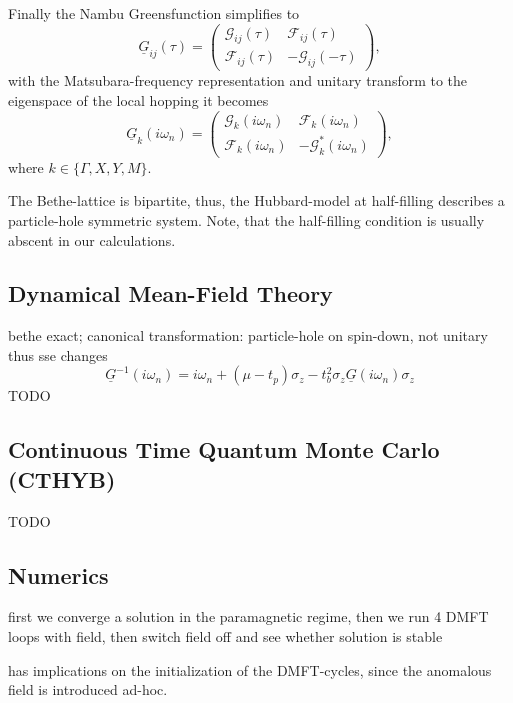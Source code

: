 \documentclass[aps,prb,twocolumn,groupedaddress,amsmath,amssymb]{revtex4-1}
\newcommand{\nambu}[1]{\mathcal{#1}}
\newcommand{\Nambu}[1]{\underline{#1}}
\begin{document}
Finally the Nambu Greensfunction simplifies to
\begin{equation}
  \label{eq:nambugftausimple}
    \Nambu{G}_{ij}(\tau)=\begin{pmatrix}\nambu{G}_{ij}(\tau)&\nambu{F}_{ij}(\tau)\\\nambu{F}_{ij}(\tau)&-\nambu{G}_{ij}(-\tau)\end{pmatrix},
 \end{equation}
with the Matsubara-frequency representation and unitary transform to the eigenspace of the local hopping it becomes
\begin{equation}
  \label{eq:nambugffreqsimple}
    \Nambu{G}_{k}(i\omega_n)=\begin{pmatrix}\nambu{G}_{k}(i\omega_n)&\nambu{F}_{k}(i\omega_n)\\\nambu{F}_{k}(i\omega_n)&-\nambu{G}_{k}^\ast(i\omega_n)\end{pmatrix},
 \end{equation}
where $k\in \{\Gamma,X,Y,M\}$.

The Bethe-lattice is bipartite, thus, the Hubbard-model at half-filling describes a particle-hole symmetric system. Note, that the half-filling condition is usually abscent in our calculations.

\subsection{Dynamical Mean-Field Theory}
bethe exact;
canonical transformation: particle-hole on spin-down, not unitary thus sse changes
\begin{equation}
  \label{eq:selfconsistency}
  \Nambu{G}^{-1}(i\omega_n)=i\omega_n+(\mu-t_{p})\sigma_z-t_{b}^2\sigma_z\Nambu{G}(i\omega_n)\sigma_z
\end{equation}
TODO\cite{Hafermann2009}\cite{Moeller1999}
\subsection{Continuous Time Quantum Monte Carlo (CTHYB)}
TODO

\subsection{Numerics}
first we converge a solution in the paramagnetic regime, then we run 4 DMFT loops with field, then switch field off and see whether solution is stable

has implications on the initialization of the DMFT-cycles, since the anomalous field is introduced ad-hoc.
\end{document}
